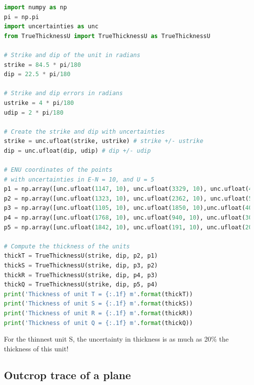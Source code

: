 \documentclass[a4paper , 12pt]{book}
\begin{document}
\begin{center}
\begin{lstlisting}[language=Python, frame=single]
import numpy as np
pi = np.pi
import uncertainties as unc
from TrueThicknessU import TrueThicknessU as TrueThicknessU

# Strike and dip of the unit in radians
strike = 84.5 * pi/180
dip = 22.5 * pi/180

# Strike and dip errors in radians
ustrike = 4 * pi/180
udip = 2 * pi/180

# Create the strike and dip with uncertainties
strike = unc.ufloat(strike, ustrike) # strike +/- ustrike
dip = unc.ufloat(dip, udip) # dip +/- udip

# ENU coordinates of the points
# with uncertainties in E-N = 10, and U = 5
p1 = np.array([unc.ufloat(1147, 10), unc.ufloat(3329, 10), unc.ufloat(400, 5)]) 
p2 = np.array([unc.ufloat(1323, 10), unc.ufloat(2362, 10), unc.ufloat(500, 5)]) 
p3 = np.array([unc.ufloat(1105, 10), unc.ufloat(1850, 10),unc.ufloat(400, 5)]) 
p4 = np.array([unc.ufloat(1768, 10), unc.ufloat(940, 10), unc.ufloat(300, 5)]) 
p5 = np.array([unc.ufloat(1842, 10), unc.ufloat(191, 10), unc.ufloat(200, 5)])

# Compute the thickness of the units
thickT = TrueThicknessU(strike, dip, p2, p1)
thickS = TrueThicknessU(strike, dip, p3, p2)
thickR = TrueThicknessU(strike, dip, p4, p3)
thickQ = TrueThicknessU(strike, dip, p5, p4) 
print('Thickness of unit T = {:.1f} m'.format(thickT))
print('Thickness of unit S = {:.1f} m'.format(thickS))
print('Thickness of unit R = {:.1f} m'.format(thickR))
print('Thickness of unit Q = {:.1f} m'.format(thickQ))
\end{lstlisting}
\end{center}

For the thinnest unit S, the uncertainty in thickness is as much as 20\% the thickness of this unit!

\subsection{Outcrop trace of a plane} \label{outcrop}
\end{document}
